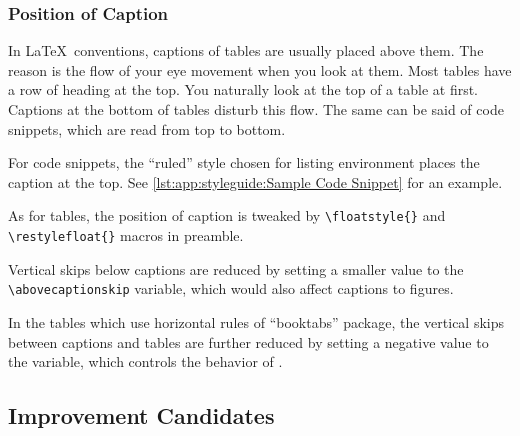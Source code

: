 \subsubsection{Position of Caption}
\label{sec:app:styleguide:Position of Caption}

In \LaTeX\ conventions, captions of tables are usually placed
above them.
The reason is the flow of your eye movement when you look at them.
Most tables have a row of heading at the top.
You naturally look at the top of a table at first.
Captions at the bottom of tables disturb this flow.
The same can be said of code snippets, which are read from
top to bottom.

For code snippets, the ``ruled'' style chosen for listing
environment places the caption at the top.
See \cref{lst:app:styleguide:Sample Code Snippet}
for an example.

As for tables, the position of caption is tweaked by
\verb|\floatstyle{}| and \verb|\restylefloat{}| macros
in preamble.

Vertical skips below captions are reduced by setting a smaller
value to the \verb|\abovecaptionskip| variable,
which would also affect captions to figures.

In the tables which use horizontal rules of ``booktabs'' package,
the vertical skips between captions and tables are further reduced
by setting a negative value to the \co{\\abovetopsep} variable,
which controls the behavior of \co{\\toprule}.

\subsection{Improvement Candidates}
\label{sec:app:styleguide:Improvement Candidates}

\begin{figure*}\centering
{}
\end{figure*}


